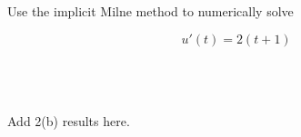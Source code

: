 Use the implicit Milne method to numerically solve

$$
u'(t) = 2(t + 1)
$$

\begin{solution}\ \\\\
\ \\

Add 2(b) results here.
\end{solution}